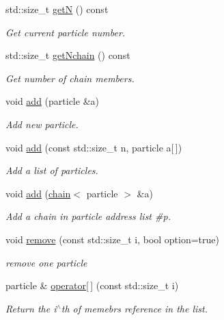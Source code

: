 \begin{DoxyCompactItemize}
std\+::size\+\_\+t \hyperlink{classARC_1_1chainlist_a9b45780f42626b14e3a2fd7b5de4bf32}{getN} () const
\begin{DoxyCompactList}\small\item\em Get current particle number. \end{DoxyCompactList}\item 
std\+::size\+\_\+t \hyperlink{classARC_1_1chainlist_aa1bd568975acc3bab3410e4fc9cb4d94}{get\+Nchain} () const
\begin{DoxyCompactList}\small\item\em Get number of chain members. \end{DoxyCompactList}\item 
void \hyperlink{classARC_1_1chainlist_afa780edfa301cc22cf189e63d7a59c2c}{add} (particle \&a)
\begin{DoxyCompactList}\small\item\em Add new particle. \end{DoxyCompactList}\item 
void \hyperlink{classARC_1_1chainlist_a2dba82eb1c3caa32fc76b619c5379da5}{add} (const std\+::size\+\_\+t n, particle a\mbox{[}$\,$\mbox{]})
\begin{DoxyCompactList}\small\item\em Add a list of particles. \end{DoxyCompactList}\item 
void \hyperlink{classARC_1_1chainlist_a28fd6f0d4ba0ec36601dc92d340b2d2b}{add} (\hyperlink{classARC_1_1chain}{chain}$<$ particle $>$ \&a)
\begin{DoxyCompactList}\small\item\em Add a chain in particle address list \#p. \end{DoxyCompactList}\item 
void \hyperlink{classARC_1_1chainlist_acfd8eb70053894bd0883a77d6c111932}{remove} (const std\+::size\+\_\+t i, bool option=true)
\begin{DoxyCompactList}\small\item\em remove one particle \end{DoxyCompactList}\item 
particle \& \hyperlink{classARC_1_1chainlist_a256df9d527eb305e14207f1ae476685c}{operator\mbox{[}$\,$\mbox{]}} (const std\+::size\+\_\+t i)
\begin{DoxyCompactList}\small\item\em Return the i$^\wedge$th of memebr\textquotesingle{}s reference in the list. \end{DoxyCompactList}\item 

\end{DoxyCompactItemize}
